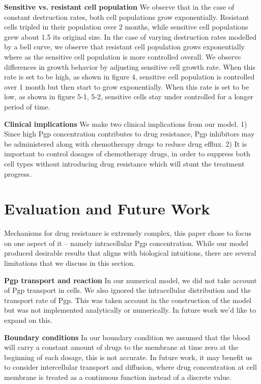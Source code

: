 \documentclass{edm_article}
\begin{document}
\textbf{Sensitive vs. resistant cell population} We observe that in the case of constant destruction rates, both cell populations grow exponentially. Resistant cells tripled in their population over 2 months, while sensitive cell populations grew about 1.5 its original size. In the case of varying destruction rates modelled by a bell curve, we observe that resistant cell population grows exponentially where as the sensitive cell population is more controlled overall. We observe differences in growth behavior by adjusting sensitive cell growth rate. When this rate is set to be high, as shown in figure 4, sensitive cell population is controlled over 1 month but then start to grow exponentially. When this rate is set to be low, as shown in figure 5-1, 5-2, sensitive cells stay under controlled for a longer period of time.

\textbf{Clinical implications} We make two clinical implications from our model. 1) Since high Pgp concentration contributes to drug resistance, Pgp inhibitors may be administered along with chemotherapy drugs to reduce drug efflux. 2) It is important to control dosages of chemotherapy drugs, in order to suppress both cell types without introducing drug resistance which will stunt the treatment progress. 

\section{Evaluation and Future Work}
Mechanisms for drug resistance is extremely complex, this paper chose to focus on one aspect of it -- namely intracellular Pgp concentration. While our model produced desirable results that aligns with biological intuitions, there are several limitations that we discuss in this section.

\textbf{Pgp transport and reaction} In our numerical model, we did not take account of Pgp transport in cells. We also ignored the intracellular distribution and the transport rate of Pgp. This was taken account in the construction of the model but was not implemented analytically or numerically. In future work we'd like to expand on this.

\textbf{Boundary conditions} In our boundary condition we assumed that the blood will carry a constant amount of drugs to the membrane at time zero at the beginning of each dosage, this is not accurate. In future work, it may benefit us to consider intercellular transport and diffusion, where drug concentration at cell membrane is treated as a continuous function instead of a discrete value. 
\end{document}

